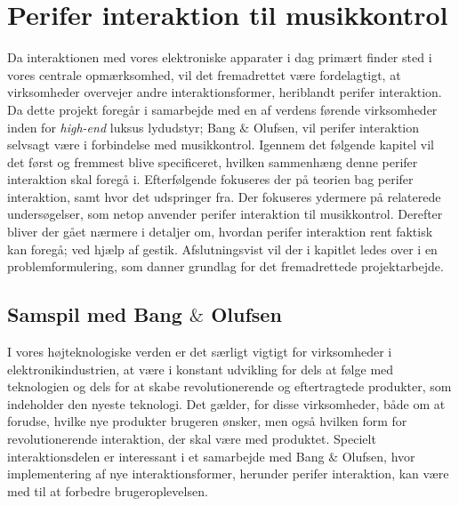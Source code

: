 \chapter{Perifer interaktion til musikkontrol}
\label{PeriferInteraktionTilMusikKontrol}
%
Da interaktionen med vores elektroniske apparater i dag primært finder sted i vores centrale opmærksomhed, vil det fremadrettet være fordelagtigt, at virksomheder overvejer andre interaktionsformer, heriblandt perifer interaktion. Da dette projekt foregår i samarbejde med en af verdens førende virksomheder inden for \textit{high-end} luksus lydudstyr; Bang $\&$ Olufsen, vil perifer interaktion selvsagt være i forbindelse med musikkontrol. Igennem det følgende kapitel vil det først og fremmest blive specificeret, hvilken sammenhæng denne perifer interaktion skal foregå i. Efterfølgende fokuseres der på teorien bag perifer interaktion, samt hvor det udspringer fra. Der fokuseres ydermere på relaterede undersøgelser, som netop anvender perifer interaktion til musikkontrol. Derefter bliver der gået nærmere i detaljer om, hvordan perifer interaktion rent faktisk kan foregå; ved hjælp af gestik. Afslutningsvist vil der i kapitlet ledes over i en problemformulering, som danner grundlag for det fremadrettede projektarbejde.    
%
\section{Samspil med Bang $\&$ Olufsen}
\label{SamspilMedBO}
%
I vores højteknologiske verden er det særligt vigtigt for virksomheder i elektronikindustrien, at være i konstant udvikling for dels at følge med teknologien og dels for at skabe revolutionerende og eftertragtede produkter, som indeholder den nyeste teknologi. Det gælder, for disse virksomheder, både om at forudse, hvilke nye produkter brugeren ønsker, men også hvilken form for revolutionerende interaktion, der skal være med produktet. Specielt interaktionsdelen er interessant i et samarbejde med Bang $\&$ Olufsen, hvor implementering af nye interaktionsformer, herunder perifer interaktion, kan være med til at forbedre brugeroplevelsen.

